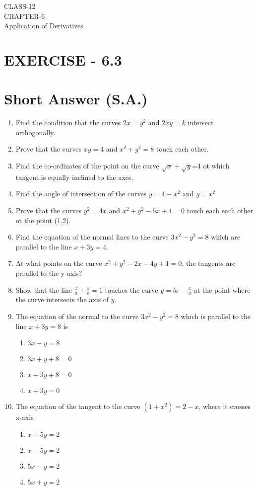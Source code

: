 \documentclass[12pt]{article}
\begin{document}
\begin{center}
\textbf\large{CLASS-12\\CHAPTER-6 \\ Application of Derivatives}
\end{center}

\section*{EXERCISE - 6.3}
\section*{Short Answer (S.A.)}
\fi
\begin{enumerate}
\item Find the condition that the curves $2x=y^2$ and $2xy=k$ intersect orthogonally.
\item Prove that the curves $xy=4$ and $x^2+y^2=8$ touch each other.
\item Find the co-ordinates of the point on the curve $\sqrt{x}+\sqrt{y}$=4 ot which tangent is equally inclined to the axes.
\item Find the angle of intersection of the curves $y=4-x^2$ and $y=x^2$
\item Prove that the curves $y^2=4x$ and $x^2+y^2-6x+1=0$ touch each each other ot the point (1,2).
\item Find the equation of the normal lines to the curve $3x^2-y^2=8$ which are parallel to the line $x+3y=4$.
\item At what points on the curve $x^2+y^2-2x-4y+1=0$, the tangents are parallel to the y-axis?
\item Show that the line $\frac{x}{a}+\frac{y}{b}=1$ touches the curve $y=be-\frac{x}{a}$ at the point where the curve intersects the axis of $y$.
 \item The equation of the normal to the curve $3x^2-y^2 =8$ which is parallel to the line $x+3y=8$ is
 \begin{enumerate}
 \item $3x-y=8$
 \item $3x+y+8=0$
 \item $x+3y+8=0$
 \item $x+3y=0$
 \end{enumerate}
\item The equation of the tangent to the curve $(1+x^2) =2-x$, where it crosses x-axis
\begin{enumerate}
\item $x+5y=2$
\item $x-5y=2$
\item $5x-y=2$
\item $5x+y=2$
\end{enumerate}
\end{enumerate}
\end{document}
